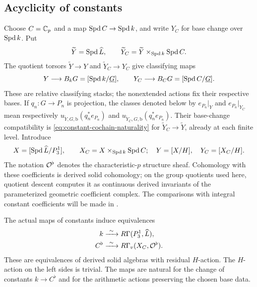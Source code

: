 \subsection{Acyclicity of constants}

Choose $C=\mathbb C_p$ and a map $\operatorname{Spd} C\to\operatorname{Spd} k$, and write $Y_C$ for
base change over $\operatorname{Spd} k$.  Put
\[
 \widetilde Y=\operatorname{Spd}\widehat L,\qquad
 \widetilde Y_C=\widetilde Y\times_{\operatorname{Spd} k}\operatorname{Spd} C.
\]
The quotient torsors $\widetilde Y\to Y$ and $\widetilde Y_C\to Y_C$
give classifying maps
\[
 Y\longrightarrow B_kG=[\operatorname{Spd} k/\underline G],\qquad
 Y_C\longrightarrow B_CG=[\operatorname{Spd} C/\underline G].
\]
These are relative classifying stacks; the nonextended actions fix
their respective bases.  If $q_n:G\to P_n$ is projection, the classes
denoted below by $e_{P_n}|_Y$ and $e_{P_n}|_{Y_C}$ mean respectively
$u_{\widetilde Y,G,\mathrm b}(q_n^*e_{P_n})$ and
$u_{\widetilde Y_C,G,\mathrm b}(q_n^*e_{P_n})$.
Their base-change compatibility is
\eqref{eq:constant-cochain-naturality} for
$\widetilde Y_C\to\widetilde Y$, already at each finite level.  Introduce
\[
 X=[\operatorname{Spd}\widehat L/P_3^1],\qquad
 X_C=X\times_{\operatorname{Spd} k}\operatorname{Spd} C;
 \quad Y=[X/H],\quad Y_C=[X_C/H].
\]
The notation $\mathcal O^{\flat}$ denotes the characteristic-$p$ structure
sheaf.  Cohomology with these coefficients is derived solid cohomology;
on the group quotients used here, quotient descent computes it as
continuous derived invariants of the parameterized geometric coefficient
complex.  The comparisons
with integral constant coefficients will be made in
.

\begin{proposition}
\label{prop:constant-acyclicity}
The actual maps of constants induce equivalences
\begin{align}
 k&\xrightarrow{\ \sim\ }R\Gamma(P_3^1,\widehat L),
       \label{eq:finite-constant-map}\\
 C^{\flat}&\xrightarrow{\ \sim\ }
       R\Gamma_v(X_C,\mathcal O^{\flat}).
       \label{eq:geometric-constant-map}
\end{align}
These are equivalences of derived solid algebras with residual $H$-action.
The $H$-action on the left sides is trivial.  The maps are natural for
the change of constants $k\to C^{\flat}$ and for the arithmetic actions
preserving the chosen base data.
\end{proposition}

